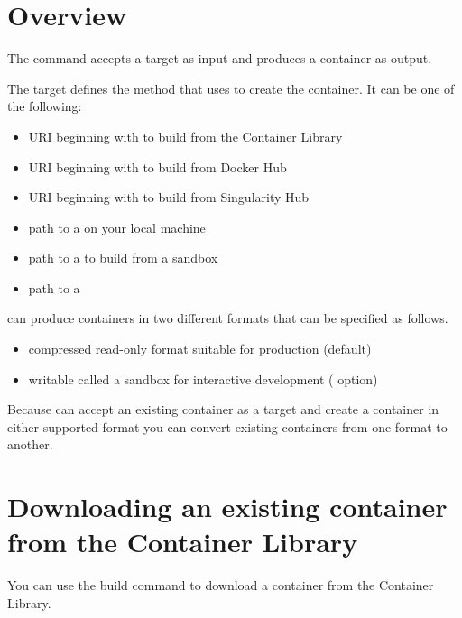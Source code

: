 \documentclass[letterpaper,10pt,english]{sphinxmanual}
\begin{document}
\section{Overview}
\label{\detokenize{build_a_container:overview}}
The  command accepts a target as input and produces a container as
output.

The target defines the method that  uses to create the container. It
can be one of the following:
\begin{itemize}
\item {} 
URI beginning with  to build from the Container Library

\item {} 
URI beginning with  to build from Docker Hub

\item {} 
URI beginning with  to build from Singularity Hub

\item {} 
path to a  on your local machine

\item {} 
path to a  to build from a sandbox

\item {} 
path to a 

\end{itemize}

 can produce containers in two different formats that can be specified
as follows.
\begin{itemize}
\item {} 
compressed read-only  format suitable for
production (default)

\item {} 
writable  called a sandbox for interactive development
(  option)

\end{itemize}

Because  can accept an existing container as a target and create a
container in either supported format you can convert existing containers from
one format to another.


\section{Downloading an existing container from the Container Library}
\label{\detokenize{build_a_container:downloading-an-existing-container-from-the-container-library}}
You can use the build command to download a container from the Container
Library.
\end{document}

